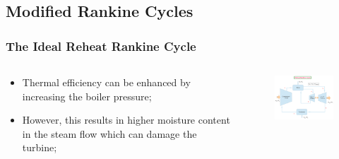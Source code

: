\documentclass[10pt,compress,handout,ignorenonframetext]{beamer}
\begin{document}
\subsection{Modified Rankine Cycles}
\begin{frame}
 \frametitle{The Ideal Reheat Rankine Cycle}
  \begin{columns}
   \begin{column}[c]{0.5\linewidth}

 \begin{itemize} %
  \item <1-> Thermal efficiency can be enhanced by increasing the boiler pressure;
  \item <2-> However, this results in higher moisture content in the steam flow which can damage the turbine;
 \end{itemize}
   \end{column}

   \begin{column}[c]{0.5\linewidth} 
    \begin{figure}%
     \begin{center}
      \includegraphics[width=6.25cm,clip]{./Pics/Reheat_Rankine_Cycle}
     \end{center}
    \end{figure}  
   \end{column}
  \end{columns}
 \normalsize
\end{frame}
\end{document}
